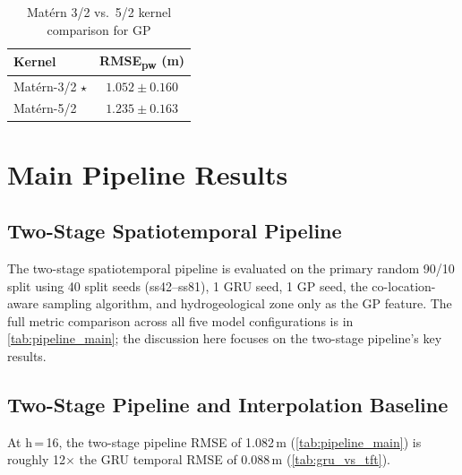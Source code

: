 \begin{table}[htbp]
\centering
\begin{tabular}{lc}
\toprule
\textbf{Kernel} & \textbf{RMSE\textsubscript{pw} (m)} \\
\midrule
Matérn-3/2 $\star$ & $1.052 \pm 0.160$ \\
Matérn-5/2          & $1.235 \pm 0.163$ \\
\bottomrule
\end{tabular}
\caption{Matérn 3/2 vs.\ 5/2 kernel comparison for GP}
\label{tab:matern_kernel_comparison}
\end{table}

\section{Main Pipeline Results}
\label{sec:main_pipeline_results}

\subsection{Two-Stage Spatiotemporal Pipeline}
\label{sec:twostage_performance}

The two-stage spatiotemporal pipeline is evaluated on the primary random 90/10 split using
40 split seeds (ss42--ss81), 1 GRU seed, 1 GP seed, the co-location-aware sampling algorithm, and
hydrogeological zone only as the GP feature. The full metric comparison across all five model
configurations is in \cref{tab:pipeline_main}; the discussion here focuses on the two-stage
pipeline's key results.

\subsection{Two-Stage Pipeline and Interpolation Baseline}
\label{sec:bottleneck}

At h\,=\,16, the two-stage pipeline RMSE of 1.082\,m (\cref{tab:pipeline_main}) is roughly 12$\times$ the GRU temporal RMSE of 0.088\,m (\cref{tab:gru_vs_tft}).

